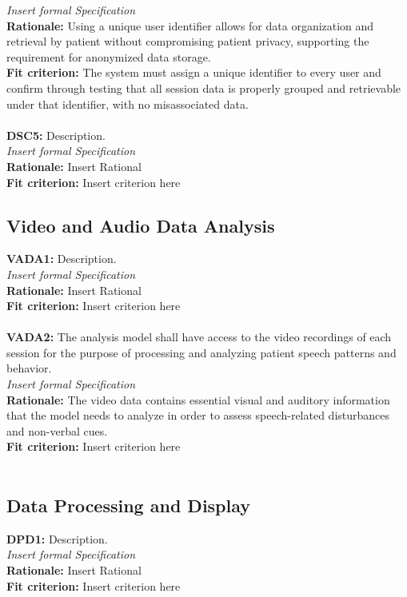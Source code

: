 \documentclass[12pt]{article}
\begin{document}
\textit{Insert formal Specification}\\
\textbf{Rationale: } Using a unique user identifier allows for data organization and retrieval by patient without 
compromising patient privacy, supporting the requirement for anonymized data storage.\\
\textbf{Fit criterion: } The system must assign a unique identifier to every user and confirm through testing 
that all session data is properly grouped and retrievable under that identifier, with no misassociated data.\\\\
\textbf{DSC5: }Description.\\
\textit{Insert formal Specification}\\
\textbf{Rationale: } Insert Rational\\
\textbf{Fit criterion: } Insert criterion here\\

\subsection{Video and Audio Data Analysis}
\textbf{VADA1: } Description.\\
\textit{Insert formal Specification}\\
\textbf{Rationale: } Insert Rational\\
\textbf{Fit criterion: } Insert criterion here \\\\
\textbf{VADA2: } The analysis model shall have access to the video recordings of each session for the purpose of processing
 and analyzing patient speech patterns and behavior.\\
\textit{Insert formal Specification}\\
\textbf{Rationale: } The video data contains essential visual and auditory information that the model needs to analyze in order to assess speech-related disturbances and non-verbal cues.\\
\textbf{Fit criterion: } Insert criterion here \\\\

\subsection{Data Processing and Display}
\textbf{DPD1: } Description.\\
\textit{Insert formal Specification}\\
\textbf{Rationale: } Insert Rational\\
\textbf{Fit criterion: } Insert criterion here 
\end{document}
